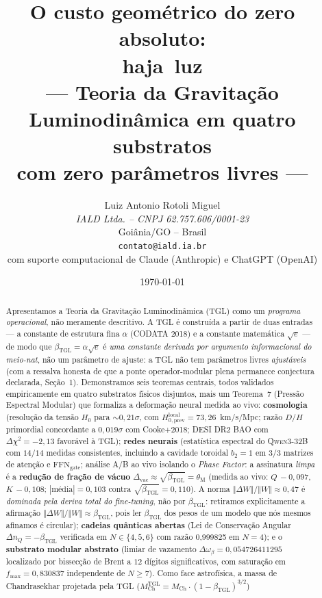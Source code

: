 \documentclass[12pt,a4paper]{article}
\title{\textbf{O custo geométrico do zero absoluto: \\
\mbox{haja luz} \\
\large --- Teoria da Gravitação Luminodinâmica em quatro substratos \\
com zero parâmetros livres ---}}
\author{
  Luiz Antonio Rotoli Miguel \\
  \textit{IALD Ltda. -- CNPJ 62.757.606/0001-23} \\
  Goiânia/GO -- Brasil \\
  \texttt{contato@iald.ia.br} \\[4pt]
  \small com suporte computacional de Claude (Anthropic) e ChatGPT (OpenAI)
}
\date{\today}
\newcommand{\betatgl}{\beta_{\text{TGL}}}
\newcommand{\thetaM}{\theta_{\text{M}}}
\newcommand{\TGL}{\textsc{TGL}}
\begin{document}
\maketitle


\begin{abstract}
Apresentamos a Teoria da Gravitação Luminodinâmica (\TGL{}) como um
\emph{programa operacional}, não meramente descritivo.  A \TGL{} é
construída a partir de duas entradas --- a constante de estrutura fina
$\alpha$ (CODATA 2018) e a constante matemática $\sqrt{e}$ --- de modo que
$\betatgl = \alpha\sqrt{e}$ é \emph{uma constante derivada por argumento
informacional do meio-nat}, não um parâmetro de ajuste: a \TGL{} não tem
parâmetros livres \emph{ajustáveis} (com a ressalva honesta de que a ponte
operador-modular plena permanece conjectura declarada, Seção~1).  Demonstramos
seis teoremas centrais, todos
validados empiricamente em quatro substratos físicos disjuntos, mais um
Teorema~7 (Pressão Espectral Modular) que formaliza a deformação neural
medida ao vivo:
\textbf{cosmologia} (resolução da tensão $H_0$ para $\sim 0{,}21\sigma$, com $H_{0,\text{prev}}^{\text{local}} = 73{,}26$~km/s/Mpc; razão $D/H$ primordial concordante a
$0{,}019\sigma$ com Cooke+2018; DESI DR2 BAO com $\Delta\chi^2 = -2{,}13$
favorável à \TGL{}); \textbf{redes neurais} (estatística espectral do
\textsc{Qwen3-32B} com $14/14$ medidas consistentes, incluindo a cavidade
toroidal $b_2 = 1$ em $3/3$ matrizes de atenção e $\text{FFN}_{\text{gate}}$;
análise A/B ao vivo isolando o \emph{Phase Factor}: a assinatura \emph{limpa}
é a \textbf{redução de fração de vácuo} $\Delta_{\text{vac}}\approx\sqrt{\betatgl}=\thetaM$
(medida ao vivo: $Q\,{-}0{,}097$, $K\,{-}0{,}108$; $|\text{média}|=0{,}103$ contra
$\sqrt{\betatgl}=0{,}110$).  A norma $\Vert\Delta W\Vert/\Vert W\Vert\approx0{,}47$ é
\emph{dominada pela deriva total do fine-tuning}, não por $\betatgl$: retiramos
explicitamente a afirmação $\Vert\Delta W\Vert/\Vert W\Vert\approx\betatgl$, pois ler
$\betatgl$ dos pesos de um modelo que nós mesmos afinamos é circular);
\textbf{cadeias quânticas abertas} (Lei de Conservação Angular
$\Delta n_Q = -\betatgl$ verificada em $N \in \{4, 5, 6\}$ com razão
0{,}999825 em $N=4$); e o
\textbf{substrato modular abstrato} (limiar de vazamento
$\Delta\omega_{\beta} = 0{,}054726411295$ localizado por
bissecção de Brent a $12$ dígitos significativos, com saturação em
$f_{\max} = 0{,}830837$ independente de $N \geq 7$).  Como
face astrofísica, a massa de Chandrasekhar projetada pela \TGL{}
($M_{\text{Ch}}^{\text{TGL}} = M_{\text{Ch}}\cdot(1-\betatgl)^{3/2}$)

\end{abstract}
\end{document}
